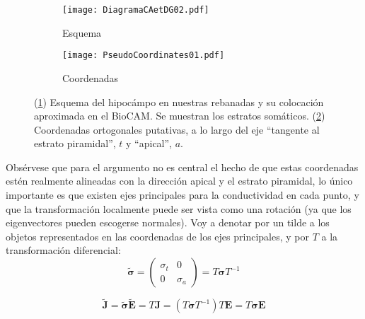 \documentclass{article}
\newcommand{\Jd}{\mathbf{J}}
\newcommand{\EF}{\mathbf{E}}
\newcommand{\cond}{\boldsymbol{\sigma}}
\begin{document}
\begin{figure}[h]
\centering
\begin{subfigure}[b]{0.45\textwidth}
\texttt{[image: DiagramaCAetDG02.pdf]}
\caption{Esquema}
\label{diagCA}
\end{subfigure}
\quad
\begin{subfigure}[b]{0.45\textwidth}
\texttt{[image: PseudoCoordinates01.pdf]}
\caption{Coordenadas}
\label{pseudocor}
\end{subfigure}
\caption{ (\ref{diagCA}) Esquema del hipocámpo en nuestras rebanadas y su
colocación aproximada en el BioCAM. Se muestran los estratos somáticos.
(\ref{pseudocor}) Coordenadas ortogonales putativas, a lo largo del eje
``tangente al estrato piramidal'', $t$ y ``apical'', $a$. } 
\label{esquemas01}
\end{figure}

Obsérvese que para el argumento no es central el hecho de que estas coordenadas
estén realmente alineadas con la dirección apical y el estrato piramidal, 
lo único importante es que existen ejes
principales para la conductividad en cada punto, y que la transformación
localmente puede ser vista como una rotación (ya que los eigenvectores pueden
escogerse normales). Voy  a denotar por un tilde a los objetos representados
en las coordenadas de los ejes principales, y por $T$ 
a la transformación diferencial:
\begin{equation}
\tilde{\cond}=
\begin{pmatrix}
\sigma_{t} & 0 \\
0 & \sigma_{a}
\end{pmatrix} = T \cond T^{-1}
\end{equation}

\begin{equation}
  \tilde{\Jd} = \tilde{\cond}\tilde{\EF}= T\Jd= (T \cond T^{-1}) T \EF = T\cond \EF
\end{equation}


 



\end{document}
